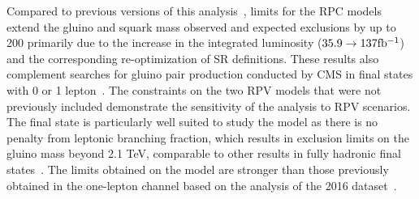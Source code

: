 

Compared to previous versions of this
analysis~\cite{CMS:mySUS2016,CMS:SUS16041}, limits for the RPC models extend
the gluino and squark mass observed and expected exclusions by up to 200\GeV
primarily due to the increase in the integrated luminosity
($35.9\rightarrow\mathrm{137fb{}^{-1}}$) and the corresponding re-optimization of
SR definitions. These results also complement searches for gluino pair
production conducted by CMS in final states with 0 or 1
lepton~\cite{CMS:2019tlp,CMS:Sirunyan2019ctn,CMS:Sirunyan2019xwh}. The
constraints on the two RPV models that were not previously included
demonstrate the sensitivity of the analysis to RPV scenarios. The final state
is particularly well suited to study the \ToqqqqL model as there is no
penalty from leptonic branching fraction, which results in exclusion limits
on the gluino mass beyond 2.1 TeV, comparable to other results in fully
hadronic final states~\cite{CMS:Sirunyan2019ctn,CMS:Sirunyan2019xwh}. The
limits obtained on the \Totbs model are stronger than those previously
obtained in the one-lepton channel based on the analysis of the 2016
dataset~\cite{CMS:Sirunyan2017dhe}.

